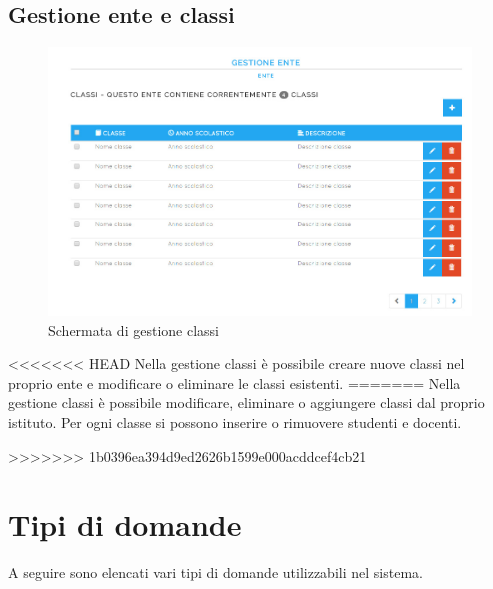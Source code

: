 \documentclass[a4paper, titlepage]{article}
\begin{document}
	 \subsection{Gestione ente e classi}
	 \begin{figure}[!h]
	 	\centering
	 	\includegraphics[scale=0.33]{Img/screen_GestioneEnteClassi.png}
	 	\caption{Schermata di gestione classi}
	 \end{figure}
<<<<<<< HEAD
	 Nella gestione classi è possibile creare nuove classi nel proprio ente e modificare o eliminare le classi esistenti.
=======
	 Nella gestione classi è possibile modificare, eliminare o aggiungere classi dal proprio istituto. Per ogni classe si possono inserire o rimuovere studenti e docenti.
	 
>>>>>>> 1b0396ea394d9ed2626b1599e000acddcef4cb21
	 
	 \newpage
	 \appendix
	 
	 \section{Tipi di domande}
	 \label{domande}
	 A seguire sono elencati vari tipi di domande utilizzabili nel sistema.
	 
\end{document}
